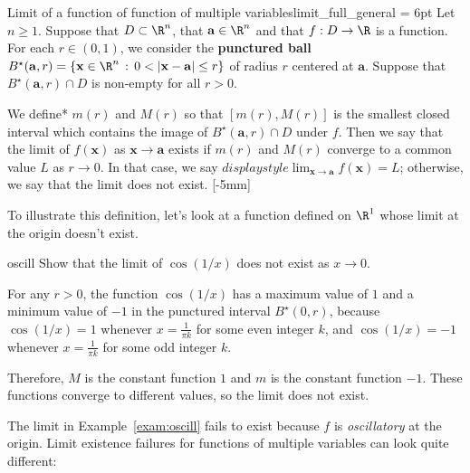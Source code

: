 \documentclass[indent]{watsonbook}
\begin{document}
{\begin{defn}{Limit of a function of function of multiple
    variables}{limit_full_general} \parskip = 6pt Let $n \geq
  1$. Suppose that $D \subset \R^n$, that $\mathbf{a}\in \R^n$ and
  that $f:D \to \R$ is a function. For each $r \in (0,1)$, we consider
  the \textbf{punctured ball}
  $B^\star(\mathbf{a},r) = \{\mathbf{x} \in \R^n \,: \, 0 <
  \left|\mathbf{x} - \mathbf{a}\right| \leq r \}$ of radius $r$
  centered at $\mathbf{a}$. Suppose that $B^\star(\mathbf{a},r) \cap
  D$ is non-empty for all $r > 0$.

  We define* $m(r)$ and $M(r)$ so that $[m(r),M(r)]$ is the smallest
  closed interval which contains the image of
  $B^\star(\mathbf{a},r) \cap D$ under $f$. Then we say that the limit
  of $f(\mathbf{x})$ as $\mathbf{x} \to \mathbf{a}$ exists if $m(r)$
  and $M(r)$ converge to a common value $L$ as $r \to 0$. In that
  case, we say
  ${d}isplaystyle{\lim_{\mathbf{x} \to \mathbf{a}} f(\mathbf{x}) = L}$;
  otherwise, we say that the limit does not exist. [-5mm]
\end{defn}

To illustrate this definition, let's look at a function defined on $\R^1$ whose limit at the origin doesn't exist.

\begin{example}{}{oscill}
  Show that the limit of $\cos (1/x)$ does not exist as $x\to0$.
\end{example}

\begin{solution}
  For any $r>0$, the function $\cos(1/x)$ has a maximum value of $1$
  and a minimum value of $-1$ in the punctured interval
  $B^\star(0,r)$, because $\cos(1/x) = 1$ whenever $x = \tfrac{1}{\pi
    k}$ for some even integer $k$, and $\cos(1/x) = -1$ whenever $x=
  \tfrac{1}{\pi k}$ for some odd integer $k$.

  Therefore, $M$ is the constant function $1$ and $m$
  is the constant function $-1$. These functions converge to different
  values, so the limit does not exist.
\end{solution}

The limit in Example~\ref{exam:oscill} fails to exist because $f$ is
\textit{oscillatory} at the origin. Limit existence failures for
functions of multiple variables can look quite different:

}
\end{document}
